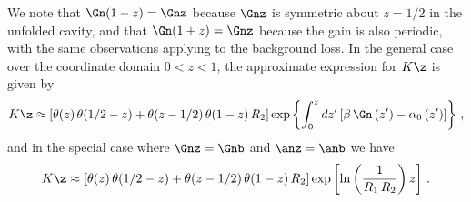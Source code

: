 We note that $\Gn(1 - z) = \Gnz$ because $\Gnz$ is symmetric about $z = 1/2$ in the unfolded cavity, and that $\Gn(1 + z) = \Gnz$ because the gain is also periodic, with the same observations applying to the background loss. In the general case over the coordinate domain $0 < z < 1$, the approximate expression for $K\z$ is given by
\begin{equation} \label{eqn:mflt_kz_genx}
    K\z \approx \left[ \theta(z)\, \theta(1/2 - z) + \theta(z - 1/2)\, \theta(1 - z)\, R_2 \right] \exp\left\{ \int_0^z d z^\prime \left[\beta\, \Gn\left(z^\prime\right) - \alpha_0\left(z^\prime\right) \right] \right\} \, ,
\end{equation}
and in the special case where $\Gnz = \Gnb$ and $\anz = \anb$ we have
\begin{equation} \label{eqn:mflt_kz_approx}
    K\z \approx \left[ \theta(z)\, \theta(1/2 - z) + \theta(z - 1/2)\, \theta(1 - z)\, R_2 \right] \exp\left[\ln\left(\frac{1}{R_1\, R_2}\right) z\right]\, .
\end{equation}

